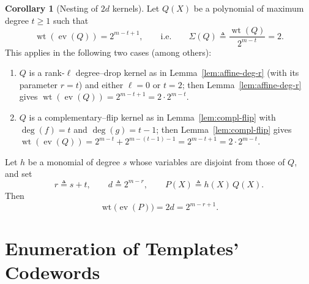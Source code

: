 \documentclass[conference]{IEEEtran}
\theoremstyle{definition}
\newtheorem{corollary}{Corollary}
\newcommand{\wt}{\operatorname{wt}}
\newcommand{\I}{\mathcal{I}}
\newcommand{\ev}{\operatorname{ev}}
\begin{document}


\begin{corollary}[Nesting of $2d$ kernels]
\label{cor:nested-2d}
Let $Q(X)$ be a polynomial of maximum
degree $t\ge1$ such that
\[
\wt(\ev(Q)) = 2^{m-t+1},
\qquad\text{i.e.}\qquad
\Sigma(Q)\triangleq\frac{\wt(Q)}{2^{m-t}}=2.
\]
This applies in the following two cases (among others):
\begin{enumerate}
  \item $Q$ is a rank-$\ell$ degree–drop kernel as in
        Lemma~\textup{\ref{lem:affine-deg-r}} (with its parameter
        $r=t$) and either $\ell=0$ or $t=2$; then
        Lemma~\textup{\ref{lem:affine-deg-r}} gives
        $\wt(\ev(Q))=2^{m-t+1}=2\cdot 2^{m-t}$.
  \item $Q$ is a complementary–flip kernel as in
        Lemma~\textup{\ref{lem:compl-flip}} with
        $\deg(f)=t$ and $\deg(g)=t-1$; then
        Lemma~\textup{\ref{lem:compl-flip}} gives
        $\wt(\ev(Q))=2^{m-t}+2^{m-(t-1)-1}=2^{m-t+1}
        =2\cdot 2^{m-t}$.
\end{enumerate}

Let $h$ be a monomial of degree $s$ whose variables are disjoint from
those of $Q$, and set
\[
r\triangleq s+t,\qquad d\triangleq 2^{m-r},\qquad
P(X)\triangleq h(X)\,Q(X).
\]
Then
\[
\wt\bigl(\ev(P)\bigr)=2d=2^{m-r+1}.
\]
\end{corollary}




\section{Enumeration of Templates' Codewords}
\label{sec:enumeration}
\end{document}
